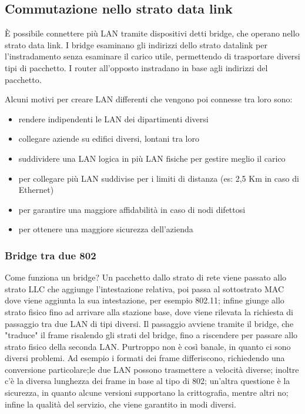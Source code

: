 \subsection{Commutazione nello strato data link} %
\`E possibile connettere più LAN tramite dispositivi detti bridge, che operano nello strato data link.
I bridge esaminano gli indirizzi dello strato datalink per l'instradamento senza esaminare il carico utile, permettendo di trasportare diversi tipi di pacchetto.
I router all'opposto instradano in base agli indirizzi del pacchetto.

Alcuni motivi per creare LAN differenti che vengono poi connesse tra loro sono:
\begin{itemize}
\item rendere indipendenti le LAN dei dipartimenti diversi
\item collegare aziende su edifici diversi, lontani tra loro
\item suddividere una LAN logica in più LAN fisiche per gestire meglio il carico
\item per collegare più LAN suddivise per i limiti di distanza (es: 2,5 Km in caso di Ethernet)
\item per garantire una maggiore affidabilità in caso di nodi difettosi
\item per ottenere una maggiore sicurezza dell'azienda
\end{itemize}

\subsubsection{Bridge tra due 802}
Come funziona un bridge?
Un pacchetto dallo strato di rete viene passato allo strato LLC che aggiunge l'intestazione relativa,
poi passa al sottostrato MAC dove viene aggiunta la sua intestazione, per esempio 802.11;
infine giunge allo strato fisico fino ad arrivare alla stazione base, dove viene rilevata la richiesta di passaggio tra due LAN di tipi diversi.
Il passaggio avviene tramite il bridge, che "traduce" il frame risalendo gli strati del bridge, fino a riscendere per passare allo strato fisico della seconda LAN.
Purtroppo non è così banale, in quanto ci sono diversi problemi.
Ad esempio i formati dei frame differiscono, richiedendo una conversione particolare;le due LAN possono trasmettere a velocità diverse;
inoltre c'è la diversa lunghezza dei frame in base al tipo di 802; un'altra questione è la sicurezza, in quanto alcune versioni supportano la crittografia, mentre altri no; infine la qualità del servizio, che viene garantito in modi diversi.

